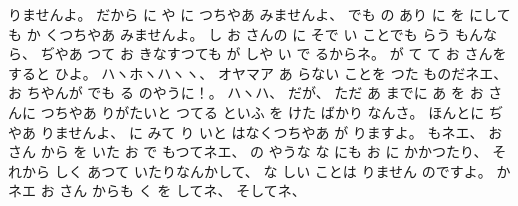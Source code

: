りませんよ。
%
だから
に
や
に%
つちやあ
みませんよ、
%
でも
%
の
あり
に
を
にしても
か
くつちやあ
みませんよ。
%
し
お
さんの
に
そで
い
ことでも
らう
もんなら、
%
ぢやあ
つて
お
きなすつても
が
しや
い
で
るからネ。
%
が
て
て
お
さんを
すると
%
ひよ。
%
ハヽホヽハヽヽ、
%
オヤマア
あ
らない
ことを
つた
ものだネエ、
%
お
ちやんが
でも
る
のやうに！。
%
ハヽハ、
だが、
%
ただ%
あ
までに
あ
を
お
さんに
つちやあ
りがたいと
つてる
といふ
を
けた
ばかり
なんさ。
%
%
ほんとに
ぢやあ
りませんよ、
%
に
みて
り
いと
はなくつちやあ
が
りますよ。
%
もネエ、
%
お
さん
から
を
いた
お
で
もつてネエ、
%
の
やうな
な
にも
お
に
かかつたり、%
%
それから
しく
あつて
いたりなんかして、
%
%
な
しい
ことは
りません
のですよ。
%
かネエ
お
さん
からも
く
を
してネ、
%
そしてネ、
